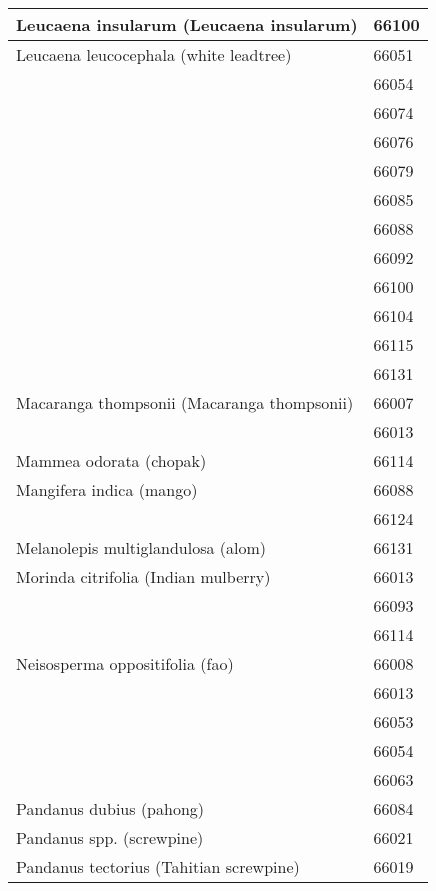 \begin{longtable}{ll}
\midrule
Leucaena insularum (Leucaena insularum) & 66100 \\
\midrule
Leucaena leucocephala (white leadtree) & 66051 \\
                                    & 66054 \\
                                    & 66074 \\
                                    & 66076 \\
                                    & 66079 \\
                                    & 66085 \\
                                    & 66088 \\
                                    & 66092 \\
                                    & 66100 \\
                                    & 66104 \\
                                    & 66115 \\
                                    & 66131 \\
\midrule
Macaranga thompsonii (Macaranga thompsonii) & 66007 \\
                                    & 66013 \\
\midrule
Mammea odorata (chopak) & 66114 \\
\midrule
Mangifera indica (mango) & 66088 \\
                                    & 66124 \\
\midrule
Melanolepis multiglandulosa (alom) & 66131 \\
\midrule
Morinda citrifolia (Indian mulberry) & 66013 \\
                                    & 66093 \\
                                    & 66114 \\
\midrule
Neisosperma oppositifolia (fao) & 66008 \\
                                    & 66013 \\
                                    & 66053 \\
                                    & 66054 \\
                                    & 66063 \\
\midrule
Pandanus dubius (pahong) & 66084 \\
\midrule
Pandanus spp. (screwpine) & 66021 \\
\midrule
Pandanus tectorius (Tahitian screwpine) & 66019 \\

\end{longtable}

